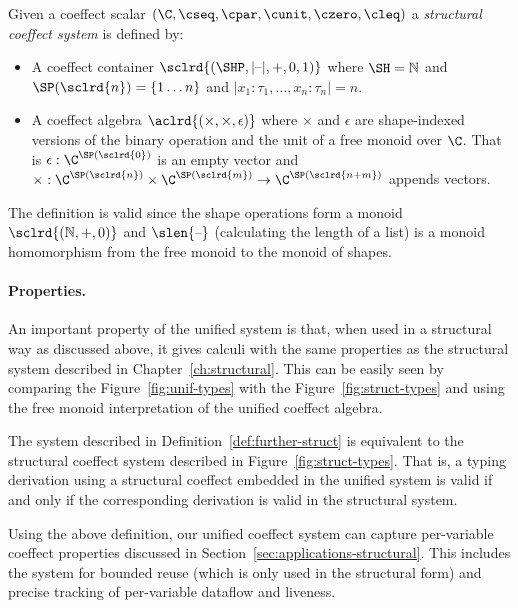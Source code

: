 \begin{definition}
\label{def:further-struct}
Given a coeffect scalar $(\C, \cseq, \cpar, \cunit, \czero, \cleq)$ a \emph{structural coeffect system}
is defined by:

\begin{itemize}
\item A coeffect container $\sclrd{(\SHP, {|}\textnormal{--}{|}, +, 0, 1)}$ where $\SH=\mathbb{N}$ and
  $\SP(\sclrd{n})=\{ 1 \ldots n \}$ and  ${|}x_1\!:\!\tau_1,\ldots,x_n\!:\!\tau_n{|}=n$.

\item A coeffect algebra $\aclrd{(\times, \times, \epsilon)}$ where $\times$ and $\epsilon$ are
  shape-indexed versions of the binary operation and the unit of a free monoid over $\C$.
  That is $\epsilon : \C^{\SP(\sclrd{0})}$ is an empty vector and
  $\times : \C^{\SP(\sclrd{n})} \times \C^{\SP(\sclrd{m})} \rightarrow \C^{\SP(\sclrd{n + m})}$
  appends vectors.
\end{itemize}
\end{definition}

\noindent
The definition is valid since the shape operations form a monoid
$\sclrd{(\mathbb{N}, +, 0)}$ and $\slen{\textnormal{--}}$ (calculating the length of
a list) is a monoid homomorphism from the free monoid to the monoid of
shapes.

\paragraph{Properties.}
An important property of the unified system is that, when used in a structural way as discussed
above, it gives calculi with the same properties as the structural system described in
Chapter~\ref{ch:structural}. This can be easily seen by comparing the Figure~\ref{fig:unif-types}
with the Figure~\ref{fig:struct-types} and using the free monoid interpretation of the unified
coeffect algebra.

\begin{remark}
The system described in Definition~\ref{def:further-struct} is equivalent to the structural coeffect
system described in Figure~\ref{fig:struct-types}. That is, a typing derivation using a structural
coeffect embedded in the unified system is valid if and only if the corresponding derivation is
valid in the structural system.
\end{remark}

\noindent
Using the above definition, our unified coeffect system can capture per-variable coeffect properties
discussed in Section~\ref{sec:applications-structural}. This includes the system for bounded reuse
(which is only used in the structural form) and precise tracking of per-variable dataflow and liveness.

